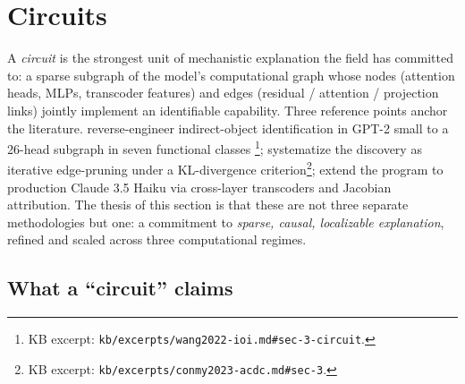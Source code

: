 
\section{Circuits}
\label{sec:circuits}

A \emph{circuit} is the strongest unit of mechanistic explanation the
field has committed to: a sparse subgraph of the model's computational
graph whose nodes (attention heads, MLPs, transcoder features) and edges
(residual / attention / projection links) jointly implement an
identifiable capability. Three reference points anchor the literature.
\citet{wang2022-ioi} reverse-engineer indirect-object identification in
GPT-2 small to a 26-head subgraph in seven functional classes
\citep[\S 3]{wang2022-ioi}\footnote{KB excerpt:
\texttt{kb/excerpts/wang2022-ioi.md\#sec-3-circuit}.};
\citet{conmy2023-acdc} systematize the discovery as iterative
edge-pruning under a KL-divergence criterion\footnote{KB excerpt:
\texttt{kb/excerpts/conmy2023-acdc.md\#sec-3}.};
\citet{lindsey2025-circuit-tracing} extend the program to production
Claude 3.5 Haiku via cross-layer transcoders and Jacobian attribution.
The thesis of this section is that these are not three separate
methodologies but one: a commitment to \emph{sparse, causal, localizable
explanation}, refined and scaled across three computational regimes.

\subsection{What a ``circuit'' claims}
\label{sec:circuit-claim}

